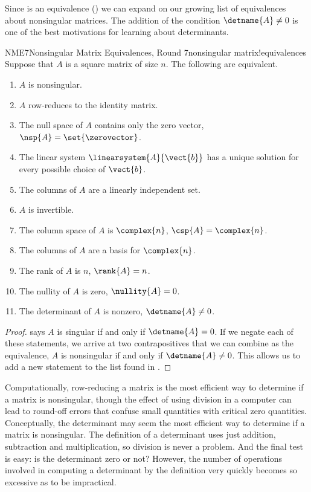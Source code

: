 %
Since  is an equivalence () we can expand on our growing list of equivalences about nonsingular matrices.  The addition of the condition $\detname{A}\neq 0$ is one of the best motivations for learning about determinants.
%
\begin{theorem}{NME7}{Nonsingular Matrix Equivalences, Round 7}{nonsingular matrix!equivalences}
Suppose that $A$ is a square matrix of size $n$.  The following are equivalent.
%
\begin{enumerate}
\item $A$ is nonsingular.
\item $A$ row-reduces to the identity matrix.
\item The null space of $A$ contains only the zero vector, $\nsp{A}=\set{\zerovector}$.
\item The linear system $\linearsystem{A}{\vect{b}}$ has a unique solution for every possible choice of $\vect{b}$.
\item The columns of $A$ are a linearly independent set.
\item $A$ is invertible.
\item The column space of $A$ is $\complex{n}$, $\csp{A}=\complex{n}$.
\item The columns of $A$ are a basis for $\complex{n}$.
\item The rank of $A$ is $n$, $\rank{A}=n$.
\item The nullity of $A$ is zero, $\nullity{A}=0$.
\item The determinant of $A$ is nonzero, $\detname{A}\neq 0$.
\end{enumerate}
\end{theorem}
%
\begin{proof}
 says $A$ is singular if and only if $\detname{A}=0$.  If we negate each of these statements, we arrive at two contrapositives that we can combine as the equivalence, $A$ is nonsingular if and only if $\detname{A}\neq 0$.  This allows us to add a new statement to the list found in .
\end{proof}
%
Computationally, row-reducing a matrix is the most efficient way to  determine if a matrix is nonsingular, though the effect of using division in a computer can lead to round-off errors that confuse small quantities with critical zero quantities.  Conceptually, the determinant may seem the most efficient way to determine if a matrix is nonsingular.  The definition of a determinant uses just addition, subtraction and multiplication, so division is never a problem.  And the final test is easy:  is the determinant zero or not?  However, the number of operations involved in computing a determinant by the definition very quickly becomes so excessive as to be impractical.\par
